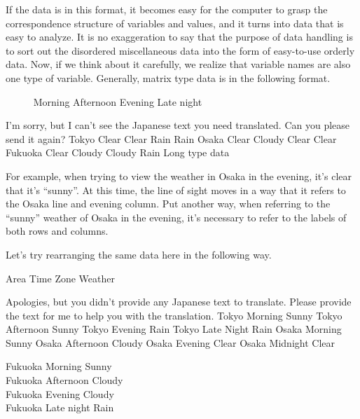 \documentclass[
  a4paper,
]{book}
\begin{document}
If the data is in this format, it becomes easy for the computer to grasp
the correspondence structure of variables and values, and it turns into
data that is easy to analyze. It is no exaggeration to say that the
purpose of data handling is to sort out the disordered miscellaneous
data into the form of easy-to-use orderly data. Now, if we think about
it carefully, we realize that variable names are also one type of
variable. Generally, matrix type data is in the following format.

~~~~~\textbar{} Morning \textbar{} Afternoon \textbar{} Evening
\textbar{} Late night \textbar{}

I'm sorry, but I can't see the Japanese text you need translated. Can
you please send it again? \textbar{} Tokyo \textbar{} Clear \textbar{}
Clear \textbar{} Rain \textbar{} Rain \textbar{} \textbar{} Osaka
\textbar{} Clear \textbar{} Cloudy \textbar{} Clear \textbar{} Clear
\textbar{} \textbar{} Fukuoka \textbar{} Clear \textbar{} Cloudy
\textbar{} Cloudy \textbar{} Rain \textbar{} Long type data

For example, when trying to view the weather in Osaka in the evening,
it's clear that it's ``sunny''. At this time, the line of sight moves in
a way that it refers to the Osaka line and evening column. Put another
way, when referring to the ``sunny'' weather of Osaka in the evening,
it's necessary to refer to the labels of both rows and columns.

Let's try rearranging the same data here in the following way.

Area \textbar{} Time Zone \textbar{} Weather \textbar{}

Apologies, but you didn't provide any Japanese text to translate. Please
provide the text for me to help you with the translation. \textbar{}
Tokyo \textbar{} Morning \textbar{} Sunny \textbar{} \textbar{} Tokyo
\textbar{} Afternoon \textbar{} Sunny \textbar{} \textbar{} Tokyo
\textbar{} Evening \textbar{} Rain \textbar{} \textbar{} Tokyo
\textbar{} Late Night \textbar{} Rain \textbar{} \textbar{} Osaka
\textbar{} Morning \textbar{} Sunny \textbar{} \textbar{} Osaka
\textbar{} Afternoon \textbar{} Cloudy \textbar{} \textbar{} Osaka
\textbar{} Evening \textbar{} Clear \textbar{} \textbar{} Osaka
\textbar{} Midnight \textbar{} Clear \textbar{}

Fukuoka \textbar{} Morning \textbar{} Sunny \textbar{}\\
Fukuoka \textbar{} Afternoon \textbar{} Cloudy \textbar{}\\
Fukuoka \textbar{} Evening \textbar{} Cloudy \textbar{}\\
Fukuoka \textbar{} Late night \textbar{} Rain \textbar{}
\end{document}
